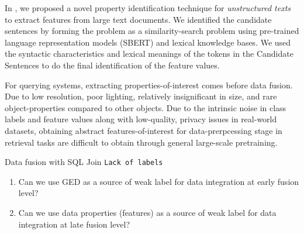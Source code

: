 %
%
In \cite{solaiman2022femmir}, we proposed a novel property identification technique for \textit{unstructured texts} to extract features from large text documents. We identified the candidate sentences by forming the problem as a similarity-search problem using pre-trained language representation models (SBERT) and lexical
knowledge bases. We used the syntactic characteristics and lexical meanings of the tokens in the Candidate Sentences to do the final identification of the feature values.


For querying systems, extracting properties-of-interest comes before data fusion.
Due to low resolution, poor lighting,  relatively insignificant in size, and rare object-properties compared to other objects.
Due to the intrinsic noise in class labels and feature values along with low-quality, privacy issues in real-world datasets, obtaining abstract features-of-interest for data-prerpcessing stage in retrieval tasks are difficult to obtain through general large-scale pretraining.

Data fusion with SQL Join
\texttt{Lack of labels}

\begin{enumerate}
    \item Can we use GED as a source of weak label for data integration at early fusion level?
    \item Can we use data properties (features) as a source of weak label for data integration at late fusion level?
\end{enumerate}
